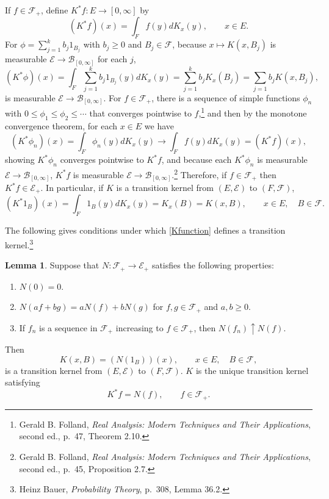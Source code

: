 \documentclass{article}
\theoremstyle{definition}
\newtheorem{lemma}[theorem]{Lemma}
\theoremstyle{definition}
\begin{document}
If $f \in \mathscr{F}_+$, define $K^*f:E \to [0,\infty]$ by
\begin{equation}
(K^* f)(x) = \int_F f(y) dK_x(y), \qquad x \in E.
\label{Kxdef}
\end{equation}
For  $\phi=\sum_{j=1}^k b_j 1_{B_j}$ with $b_j \geq 0$ and $B_j \in \mathscr{F}$,
because $x \mapsto K(x,B_j)$ is measurable $\mathscr{E} \to \mathscr{B}_{[0,\infty]}$ for each $j$,
\[
(K^*\phi)(x) = \int_F \sum_{j=1}^k b_j 1_{B_j}(y) dK_x(y) = \sum_{j=1}^k b_j K_x(B_j)
=\sum_{j=1} b_j K(x,B_j),
\]
is measurable $\mathscr{E} \to \mathscr{B}_{[0,\infty]}$. 
For $f \in \mathscr{F}_+$, there is a sequence
of simple functions $\phi_n$ with $0\leq \phi_1 \leq \phi_2 \leq \cdots$ that converges pointwise to $f$,\footnote{Gerald B. Folland,
{\em Real Analysis: Modern Techniques and Their Applications}, second ed., p.~47, Theorem 2.10.} and then
by the monotone convergence theorem, for each $x \in E$ we have
\[
(K^*\phi_n)(x) =  \int_F \phi_n(y) dK_x(y) \to \int_F f(y) dK_x(y) = (K^*f)(x),
\]
showing $K^* \phi_n$ converges pointwise to $K^* f$, and because each $K^* \phi_n$ is measurable $\mathscr{E} \to \mathscr{B}_{[0,\infty]}$,
$K^* f$ is measurable $\mathscr{E} \to \mathscr{B}_{[0,\infty]}$.\footnote{Gerald B. Folland,
{\em Real Analysis: Modern Techniques and Their Applications}, second ed., p.~45, Proposition 2.7.}
Therefore, if $f \in \mathscr{F}_+$ then $K^* f \in \mathscr{E}_+$.
In particular, if $K$ is a transition kernel from $(E,\mathscr{E})$ to $(F,\mathscr{F})$,
\begin{equation}
(K^* 1_B)(x) = \int_F 1_B(y) dK_x(y) = K_x(B) = K(x,B), \qquad x \in E, \quad B \in \mathscr{F}.
\label{Kfunction}
\end{equation}



The following  gives conditions under which 
\eqref{Kfunction} defines a transition kernel.\footnote{Heinz Bauer, {\em Probability Theory},
p.~308, Lemma 36.2.}

\begin{lemma}
Suppose that $N:\mathscr{F}_+ \to \mathscr{E}_+$ satisfies the following properties:
\begin{enumerate}
\item $N(0)=0$.
\item $N(af+bg)=aN(f)+bN(g)$ for $f,g \in \mathscr{F}_+$ and $a,b \geq 0$.
\item If $f_n$ is a sequence in $\mathscr{F}_+$ increasing to $f \in \mathscr{F}_+$, then 
$N(f_n) \uparrow N(f)$.
\end{enumerate}
Then 
\[
K(x,B) = (N(1_B))(x), \qquad x \in E, \quad B \in \mathscr{F},
\]
is a transition kernel
from $(E,\mathscr{E})$ to $(F,\mathscr{F})$. $K$ is the unique transition kernel satisfying
\[
K^* f = N(f), \qquad f \in \mathscr{F}_+.
\]
\label{kernel}
\end{lemma}
\end{document}
